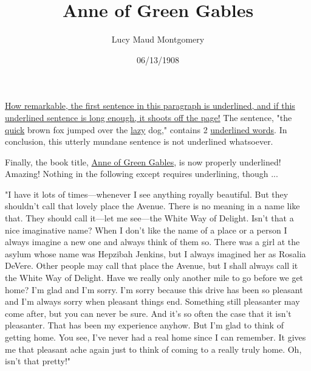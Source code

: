 \documentclass[a4paper]{article}
\title{Anne of Green Gables}
\author{Lucy Maud Montgomery}
\date{06/13/1908}
\begin{document}
\maketitle

\underline{How remarkable, the first sentence in this paragraph is underlined, and if this underlined sentence is long enough, it shoots off the page!} The sentence, "the \underline{quick} brown fox jumped over the \underline{lazy} dog," contains 2 \underline{underlined words}. In conclusion, this utterly mundane sentence is not underlined whatsoever.

Finally, the book title, \underline{Anne of Green Gables}, is now properly underlined! Amazing! Nothing in the following except requires underlining, though ...

"I have it lots of times---whenever I see anything royally beautiful. But they shouldn't call that lovely place the Avenue. There is no meaning in a name like that. They should call it---let me see---the White Way of Delight. Isn't that a nice imaginative name? When I don't like the name of a place or a person I always imagine a new one and always think of them so. There was a girl at the asylum whose name was Hepzibah Jenkins, but I always imagined her as Rosalia DeVere. Other people may call that place the Avenue, but I shall always call it the White Way of Delight. Have we really only another mile to go before we get home? I'm glad and I'm sorry. I'm sorry because this drive has been so pleasant and I'm always sorry when pleasant things end. Something still pleasanter may come after, but you can never be sure. And it's so often the case that it isn't pleasanter. That has been my experience anyhow. But I'm glad to think of getting home. You see, I've never had a real home since I can remember. It gives me that pleasant ache again just to think of coming to a really truly home. Oh, isn't that pretty!"
\end{document}
